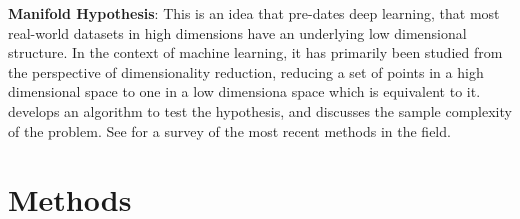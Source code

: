 \documentclass{article}
\begin{document}
            \textbf{Manifold Hypothesis}: This is an idea that pre-dates deep learning, that most real-world datasets in high dimensions have an underlying low dimensional structure. In the context of machine learning, it has primarily been studied from the perspective of dimensionality reduction, reducing a set of points in a high dimensional space to one in a low dimensiona space which is equivalent to it. \cite{fefferman2013testingmanifoldhypothesis} develops an algorithm to test the hypothesis, and \cite{NIPS2010_8a1e808b} discusses the sample complexity of the problem. See \cite{meil2023manifoldlearningwhathow} for a survey of the most recent methods in the field. 

    \section{Methods}

        

        
\end{document}
